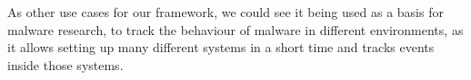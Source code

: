 As other use cases for our framework, we could see it being used as a basis for
malware research, to track the behaviour of malware in different environments,
as it allows setting up many different systems in a short time and tracks
events inside those systems.

